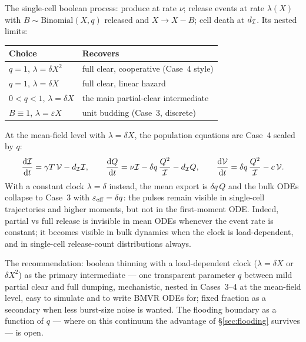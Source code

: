 The single-cell boolean process: produce at rate $\nu$; release events at
rate $\lambda(X)$ with $B\sim\mathrm{Binomial}(X,q)$ released and $X\to
X-B$; cell death at $d_{\mathcal{I}}$. Its nested limits:
\begin{center}
\renewcommand{\arraystretch}{1.2}
\small
\begin{tabular}{@{}ll@{}}
\toprule
Choice & Recovers \\
\midrule
$q=1$, $\lambda=\delta X^2$ & full clear, cooperative (Case~4 style) \\
$q=1$, $\lambda=\delta X$ & full clear, linear hazard \\
$0<q<1$, $\lambda=\delta X$ & the main partial-clear intermediate \\
$B\equiv1$, $\lambda=\varepsilon X$ & unit budding (Case~3, discrete) \\
\bottomrule
\end{tabular}
\end{center}
At the mean-field level with $\lambda=\delta X$, the population equations
are Case~4 scaled by $q$:
\begin{equation}
\displaystyle\frac{{\rm d} \mathcal{I}}{{\rm d} t}=\gamma T\,\mathcal{V}-d_{\mathcal{I}}\mathcal{I},
\qquad
\displaystyle\frac{{\rm d} Q}{{\rm d} t}=\nu\mathcal{I}-\delta q\,\frac{Q^2}{\mathcal{I}}-d_{\mathcal{I}}Q,
\qquad
\displaystyle\frac{{\rm d} \mathcal{V}}{{\rm d} t}=\delta q\,\frac{Q^2}{\mathcal{I}}-c\,\mathcal{V}.
\end{equation}
With a constant clock $\lambda=\delta$ instead, the mean export is
$\delta q\,Q$ and the bulk ODEs collapse to Case~3 with
$\varepsilon_{\rm eff}=\delta q$: the pulses remain visible in single-cell
trajectories and higher moments, but not in the first-moment ODE. Indeed,
partial vs full release is invisible in mean ODEs whenever the event rate
is constant; it becomes visible in bulk dynamics when the clock is
load-dependent, and in single-cell release-count distributions always.

The recommendation: boolean thinning with a load-dependent clock
($\lambda=\delta X$ or $\delta X^2$) as the primary intermediate --- one
transparent parameter $q$ between mild partial clear and full dumping,
mechanistic, nested in Cases~3--4 at the mean-field level, easy to simulate
and to write BMVR ODEs for; fixed fraction as a secondary when less
burst-size noise is wanted. The flooding boundary as a function of $q$ ---
where on this continuum the advantage of \S\ref{sec:flooding} survives ---
is open.
